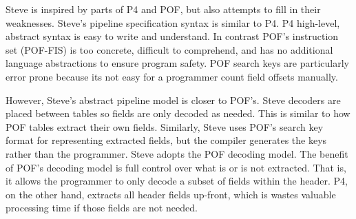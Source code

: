 Steve is inspired by parts of P4 and POF, but also attempts to
fill in their weaknesses. 
Steve's pipeline specification syntax is similar to P4.
P4 high-level, abstract syntax is easy to write and understand. 
In contrast POF's instruction set (POF-FIS) \cite{pof_fis} is too
concrete, difficult to comprehend, and has no additional language
abstractions to ensure program safety.
POF search keys are particularly error prone because its not easy
for a programmer count field offsets manually.

However, Steve's abstract pipeline model is closer to POF's.
Steve decoders are placed between tables so fields are only decoded
as needed. This is similar to how POF tables extract their own fields.
Similarly, Steve uses POF's search key format for representing extracted fields, but the compiler generates the keys rather than the programmer. Steve adopts the POF decoding model.
The benefit of POF's decoding model is full control over what is or is not
extracted. 
That is, it allows the programmer to only decode a subset of fields within the header.
P4, on the other hand, extracts all header fields up-front, which is wastes 
valuable processing time if those fields are not needed.





